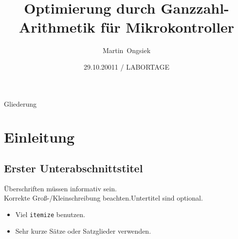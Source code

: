 \documentclass{beamer}
\title[] %
{Optimierung durch Ganzzahl-Arithmetik für Mikrokontroller}
\author[] %
{Martin~Ongsiek}
\date[labortage] %
{29.10.20011 / LABORTAGE}
\begin{document}
\begin{frame}
  \titlepage
\end{frame}

\begin{frame}{Gliederung}
  \tableofcontents
\end{frame}



\section{Einleitung}

\subsection[Kurzversion des ersten Unterabschnittstitels]
{Erster Unterabschnittstitel}

\begin{frame}{Überschriften müssen informativ sein.\\
    Korrekte Groß-/Kleinschreibung beachten.}{Untertitel sind optional.}

  \begin{itemize}
  \item
    Viel \texttt{itemize} benutzen.
  \item
    Sehr kurze Sätze oder Satzglieder verwenden.
  \end{itemize}
\end{frame}
\end{document}
